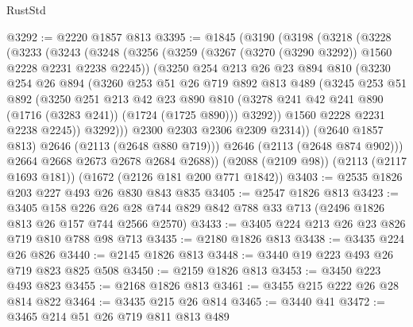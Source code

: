 \begin{lexlean}{RustStd}
\begin{coremodule}
@3292 := @2220 @1857 @813
@3395 := @1845
    (@3190
      (@3198
        (@3218
          (@3228
            (@3233
              (@3243
                (@3248
                  (@3256
                    (@3259 (@3267 (@3270 (@3290 @3292)) @1560 @2228 @2231 @2238 @2245))
                    (@3250
                      @254
                      @213
                      @26
                      @23
                      @894
                      @810
                      (@3230
                        @254
                        @26
                        @894
                        (@3260
                          @253
                          @51
                          @26
                          @719
                          @892
                          @813
                          @489
                          (@3245
                            @253
                            @51
                            @892
                            (@3250
                              @251
                              @213
                              @42
                              @23
                              @890
                              @810
                              (@3278 @241 @42 @241 @890 (@1716 (@3283 @241)) (@1724 (@1725 @890)))
                              @3292))
                          @1560
                          @2228
                          @2231
                          @2238
                          @2245))
                      @3292)))
                @2300
                @2303
                @2306
                @2309
                @2314))
            (@2640 @1857 @813)
            @2646
            (@2113 (@2648 @880 @719)))
          @2646
          (@2113 (@2648 @874 @902)))
        @2664
        @2668
        @2673
        @2678
        @2684
        @2688))
    (@2088 (@2109 @98))
    (@2113 (@2117 @1693 @181))
    (@1672 (@2126 @181 @200 @771 @1842))
@3403 := @2535 @1826 @203 @227 @493 @26 @830 @843 @835
@3405 := @2547 @1826 @813
@3423 := @3405
    @158
    @226
    @26
    @28
    @744
    @829
    @842
    @788
    @33
    @713
    (@2496 @1826 @813 @26 @157 @744 @2566 @2570)
@3433 := @3405 @224 @213 @26 @23 @826 @719 @810 @788 @98 @713
@3435 := @2180 @1826 @813
@3438 := @3435 @224 @26 @826
@3440 := @2145 @1826 @813
@3448 := @3440 @19 @223 @493 @26 @719 @823 @825 @508
@3450 := @2159 @1826 @813
@3453 := @3450 @223 @493 @823
@3455 := @2168 @1826 @813
@3461 := @3455 @215 @222 @26 @28 @814 @822
@3464 := @3435 @215 @26 @814
@3465 := @3440 @41
@3472 := @3465 @214 @51 @26 @719 @811 @813 @489

\end{coremodule}
\end{lexlean}
